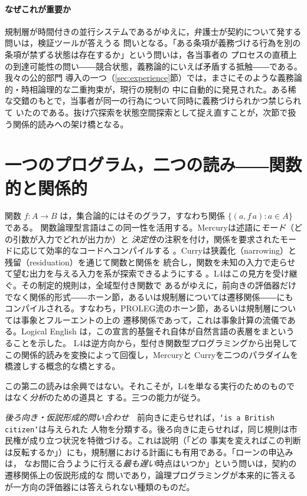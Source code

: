 \documentclass[11pt,a4paper]{ltjsarticle}
\newcommand{\code}[1]{\texttt{\small #1}}
\begin{document}
\paragraph{なぜこれが重要か}
規制層が時間付きの並行システムであるがゆえに，弁護士が契約について発する問いは，検証ツールが答えうる
問いとなる。「ある条項が義務づける行為を別の条項が禁ずる状態は存在するか」という問いは，各当事者の
プロセスの直積上の到達可能性の問い――競合状態，義務論的にいえば矛盾する抵触――である。我々の公的部門
導入の一つ（\ref{sec:experience}節）では，まさにそのような義務論的・時相論理的な二重拘束が，現行の規制の
中に自動的に発見された。ある稀な交錯のもとで，当事者が同一の行為について同時に義務づけられかつ禁じられて
いたのである。抜け穴探索を状態空間探索として捉え直すことが，次節で扱う関係的読みへの架け橋となる。

\section{一つのプログラム，二つの読み――関数的と関係的}\label{sec:relational}
関数 $f : A \to B$ は，集合論的にはそのグラフ，すなわち関係 $\{(a, f\,a) : a \in A\}$ である。
関数論理型言語はこの同一性を活用する。Mercuryは述語に\emph{モード}（どの引数が入力でどれが出力か）と
\emph{決定性}の注釈を付け，関係を要求されたモードに応じて効率的なコードへコンパイルする
\cite{somogyi1996mercury}。Curryは狭義化（narrowing）と残留（residuation）を通じて関数と関係を
統合し，関数を未知の入力で走らせて望む出力を与える入力を系が探索できるようにする
\cite{antoy2010flp,hanus2013curry}。L4はこの見方を受け継ぐ。その制定的規則は，全域型付き関数で
あるがゆえに，前向きの評価器だけでなく関係的形式――ホーン節，あるいは規制層については遷移関係――にも
コンパイルされる。すなわち，PROLEG流のホーン節，あるいは規制層については事象とフルーエントの上の
遷移関係であって，これは事象計算の流儀である\cite{kowalski1986events}。Logical English
\cite{kowalski2021logicalenglish}は，この宣言的基盤それ自体が自然言語の表層をまというることを示した。
L4は逆方向から，型付き関数型プログラミングから出発してこの関係的読みを変換によって回復し，Mercuryと
Curryを二つのパラダイムを橋渡しする概念的な橋とする。

この第二の読みは余興ではない。それこそが，L4を単なる実行のためのものではなく\emph{分析}のための道具と
する。三つの能力が従う。

\emph{後ろ向き・仮説形成的問い合わせ}　前向きに走らせれば，\code{`is a British citizen`}は与えられた
人物を分類する。後ろ向きに走らせれば，同じ規則は市民権が成り立つ状況を特徴づける。これは説明（「どの
事実を変えればこの判断は反転するか」）にも，規制層における計画にも有用である。「ローンの申込みは，
なお間に合うように行える\emph{最も遅い}時点はいつか」という問いは，契約の遷移関係上の仮説形成的な
問いであり，論理プログラミングが本来的に答えるが一方向の評価器には答えられない種類のものだ。
\end{document}
